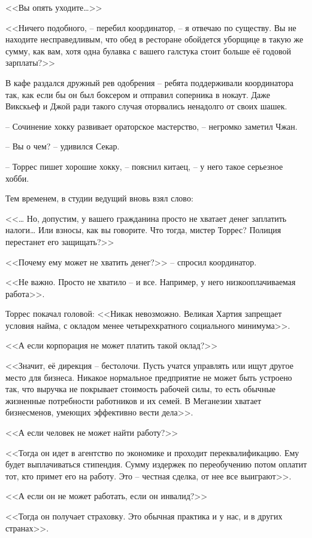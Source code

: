 <<Вы опять уходите\ldots{}>>

<<Ничего подобного, -- перебил координатор, -- я отвечаю по существу. Вы не находите несправедливым, что обед в ресторане обойдется уборщице в такую же сумму, как вам, хотя одна булавка с вашего галстука стоит больше её годовой зарплаты?>>

В кафе раздался дружный рев одобрения -- ребята поддерживали координатора так, как если бы он был боксером и отправил соперника в нокаут. Даже Викскьеф и Джой ради такого случая оторвались ненадолго от своих шашек.

-- Сочинение хокку развивает ораторское мастерство, -- негромко заметил Чжан.

-- Вы о чем? -- удивился Секар.

-- Торрес пишет хорошие хокку, -- пояснил китаец, -- у него такое серьезное хобби.

Тем временем, в студии ведущий вновь взял слово:

<<\ldots{} Но, допустим, у вашего гражданина просто не хватает денег заплатить налоги\ldots{} Или взносы, как вы говорите. Что тогда, мистер Торрес? Полиция перестанет его защищать?>>

<<Почему ему может не хватить денег?>> -- спросил координатор.

<<Не важно. Просто не хватило -- и все. Например, у него низкооплачиваемая работа>>.

Торрес покачал головой: <<Никак невозможно. Великая Хартия запрещает условия найма, с окладом менее четырехкратного социального минимума>>.

<<А если корпорация не может платить такой оклад?>>

<<Значит, её дирекция -- бестолочи. Пусть учатся управлять или ищут другое место для бизнеса. Никакое нормальное предприятие не может быть устроено так, что выручка не покрывает стоимость рабочей силы, то есть обычные жизненные потребности работников и их семей. В Меганезии хватает бизнесменов, умеющих эффективно вести дела>>.

<<А если человек не может найти работу?>>

<<Тогда он идет в агентство по экономике и проходит переквалификацию. Ему будет выплачиваться стипендия. Сумму издержек по переобучению потом оплатит тот, кто примет его на работу. Это -- честная сделка, от нее все выиграют>>.

<<А если он не может работать, если он инвалид?>>

<<Тогда он получает страховку. Это обычная практика и у нас, и в других странах>>.

